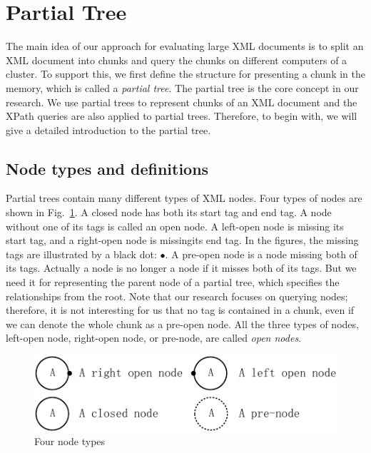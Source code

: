 \section{Partial Tree}
\label{sec:partialtree}

The main idea of our approach for evaluating large XML documents is to 
split an XML document into chunks and query the chunks on different 
computers of a cluster. To support this, we first define the structure for presenting a chunk in
the memory, which is called a \emph{partial tree}.
The partial tree is the core concept in our research. We use partial trees
to represent chunks of an XML document and the XPath queries are also
applied to partial trees. Therefore, to begin with, we will give a
detailed introduction to the partial tree.

\subsection{Node types and definitions}

Partial trees contain many different types of XML nodes.
Four types of nodes are shown in Fig.~\ref{fig:nodetypes}.  A 
closed node has both its start tag and end tag. A node without one of 
its tags is called an open node. A left-open node is missing its start tag, 
and a right-open node is missingits end tag. 
In the figures, the missing tags are illustrated by a black
dot: $\bullet$. A pre-open node is a node missing both of its tags. 
Actually a node is no longer a node if it misses both of its tags. 
But we need it for representing the parent node of a partial tree, 
which specifies the relationships from the root. 
Note that our research focuses on querying nodes; therefore, it is not interesting 
for us that no tag is contained in a chunk, even if we can denote the whole chunk as a pre-open node. 
All the three types of nodes, left-open node, right-open node, or pre-node, are called \emph{open nodes}.
\begin{figure}[t]
	\centering\includegraphics{partialtree/figures/fromWord-2.pdf}
	\caption{Four node types}
	\label{fig:nodetypes}
\end{figure}

